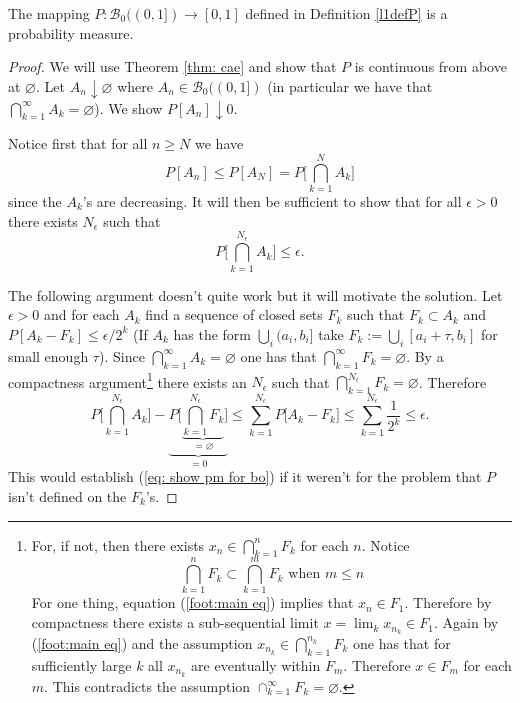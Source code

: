 \begin{theorem}
\label{thm: Borels P is a measure}
 The mapping $P:\mathcal B_0((0,1])\rightarrow [0,1]$ defined in Definition \ref{l1defP} is a probability measure.
 \end{theorem}
\begin{proof}
We will use Theorem \ref{thm: cae} and show that $P$ is continuous from above at $\varnothing.$ Let $A_n \downarrow \varnothing$ where $A_n\in \mathcal B_0((0,1])$ (in particular we have that $\bigcap_{k=1}^\infty A_k =\varnothing$). We show $P[A_n]\downarrow 0$.

Notice first that for all $n\geq N$ we have
\[ P[A_n]\leq P[A_N] =  P\bigl[ \textstyle\bigcap_{k=1}^N A_k\bigr] \]
since the $A_k$'s are decreasing. It will then be sufficient to show that for all $\epsilon>0$ there exists  $N_\epsilon$ such that
\begin{equation}
\label{eq: show pm for bo}
P\bigl[ \textstyle\bigcap_{k=1}^{N_\epsilon} A_k\bigr]\leq \epsilon.
\end{equation}

The following argument doesn't quite work but it will motivate the solution. Let $\epsilon > 0$ and for each $A_k$  find a sequence of closed sets $F_k$ such that $F_k\subset A_k$ and $P[A_k-F_k]\leq \epsilon/2^k$ (If $A_k$ has the form $\bigcup_i (a_i,b_i]$ take $F_k:=\bigcup_i [a_i+\tau,b_i]$ for small enough $\tau$). Since $\bigcap_{k=1}^\infty A_k=\varnothing$ one has that $\bigcap_{k=1}^\infty F_k=\varnothing$.
By a compactness argument\footnote{For, if not, then there exists $x_n\in \bigcap_{k=1}^n F_k$ for each $n$. Notice
\begin{equation}
\label{foot:main eq}
\text{$\bigcap_{k=1}^n F_k\subset \bigcap_{k=1}^m F_k$ when $m\leq n$}
\end{equation}
For one thing, equation (\ref{foot:main eq}) implies that $x_n\in F_1$. Therefore by compactness  there exists a  sub-sequential limit $x=\lim_k x_{n_k} \in F_1$.  Again by (\ref{foot:main eq}) and the assumption  $x_{n_k}\in \bigcap_{k=1}^{n_k} F_k$ one has that for sufficiently large $k$ all  $x_{n_k}$ are eventually within $F_m$. Therefore $x\in F_m$ for each $m$. This contradicts the assumption $\cap_{k=1}^\infty F_k=\varnothing$.  } there exists an $N_\epsilon$ such that $\bigcap_{k=1}^{N_\epsilon} F_k=\varnothing$.
 Therefore
\[
P\bigl[ \textstyle\bigcap_{k=1}^{N_\epsilon} A_k\bigr] - \underbrace{P\bigl[ \underbrace{\textstyle\bigcap_{k=1}^{N_\epsilon} F_k}_{=\varnothing}\bigr]}_{=0}\leq  \sum_{k=1}^{N_\epsilon} P\bigl[A_k-F_k \bigr] \leq \sum_{k=1}^{N_\epsilon} \frac{1}{2^k}\leq \epsilon.
\]
This would establish (\ref{eq: show pm for bo}) if it weren't for the problem that $P$ isn't defined on the $F_k$'s.


\end{proof}
